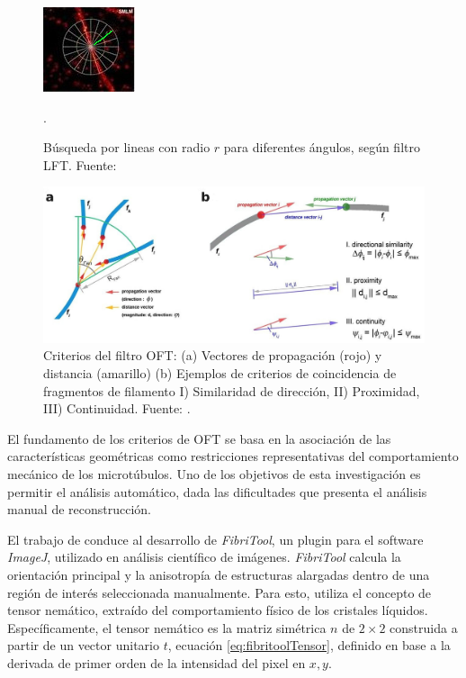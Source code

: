 \begin{figure}[h]
        \centering
        \includegraphics[scale=5]{imagenes/MT-LFT.jpeg}
        \caption{B\'usqueda por lineas con radio $r$ para diferentes \'angulos, según filtro LFT. Fuente: \cite{zhang2017extracting}}.
        \label{fig:MTLFT}
\end{figure}

\begin{figure}[h]
        \centering
        \includegraphics[scale=0.38]{imagenes/MT-OFT.jpeg}
        \caption{Criterios del filtro OFT: (a) Vectores de propagaci\'on (rojo) y distancia (amarillo) (b) Ejemplos de criterios de coincidencia de fragmentos de filamento I) Similaridad de direcci\'on, II) Proximidad, III) Continuidad. Fuente: \cite{zhang2017extracting}.}
        \label{fig:MTOFT}
\end{figure}


El fundamento de los criterios de OFT se basa en la asociaci\'on de las caracter\'isticas geom\'etricas como restricciones representativas del comportamiento mec\'anico de los microt\'ubulos. Uno de los objetivos de esta investigaci\'on es permitir el an\'alisis autom\'atico, dada las dificultades que presenta el an\'alisis manual de reconstrucci\'on. %


El trabajo de \cite{boudaoud2014fibriltool} conduce al desarrollo de {\it FibriTool}, un plugin para el software {\it ImageJ}, utilizado en an\'alisis cient\'ifico de im\'agenes. {\it FibriTool} calcula la orientaci\'on principal y la anisotrop\'ia de estructuras alargadas dentro de una regi\'on de inter\'es seleccionada manualmente. Para esto, utiliza el concepto de tensor nem\'atico, extra\'ido del comportamiento f\'isico de los cristales l\'iquidos. Espec\'ificamente, el tensor nem\'atico es la matriz sim\'etrica $n$ de $2\times2$ construida a partir de un vector unitario $t$, ecuaci\'on \ref{eq:fibritoolTensor}, definido en base a la derivada de primer orden de la intensidad del pixel en $x,y$. %

